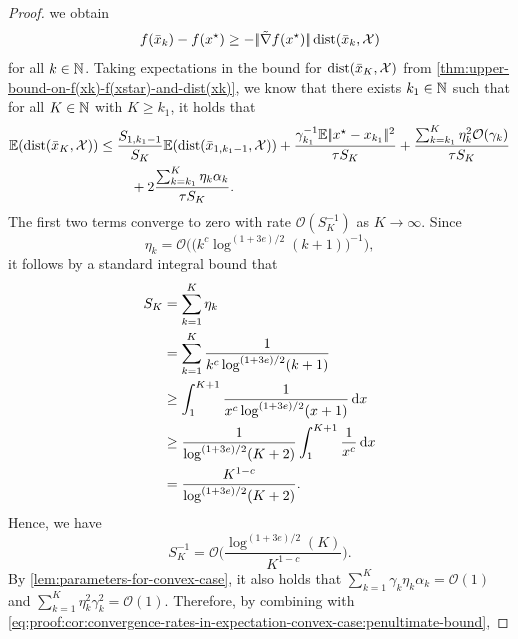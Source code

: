 \begin{proof}
    we obtain
    \begin{equation}
        \label{eq:proof:cor:convergence-rates-in-expectation-convex-case}
        f(\bar{x}_k) - f(x^\star) \geq - |\!|\tilde{\nabla} f(x^\star)|\!| \operatorname{dist}(\bar{x}_k, \mathcal{X})
    \end{equation}
    for all $k\in\mathbb{N}$.
    Taking expectations in the bound for $\operatorname{dist}(\bar{x}_K, \mathcal{X})$
    from \cref{thm:upper-bound-on-f(xk)-f(xstar)-and-dist(xk)},
    we know that there exists $k_1\in\mathbb{N}$ such that for all $K\in\mathbb{N}$ with $K\geq k_1$,
    it holds that
    \begin{align}
        \label{eq:proof:cor:convergence-rates-in-expectation-convex-case:penultimate-bound}
        \mathbb{E}(\operatorname{dist}(\bar{x}_K, \mathcal{X}))
        &\leq
        \frac{S_{1, k_1-1}}{S_K} \mathbb{E}(\operatorname{dist}(\bar{x}_{1, k_1-1}, \mathcal{X}))
            + \frac{\gamma_{k_1}^{-1}\mathbb{E}|\!|x^\star - x_{k_1}|\!|^2}{\tau S_K}
            + \frac{\sum_{k=k_1}^{K} \eta_k^2\mathcal{O}(\gamma_k)}{\tau S_K} \notag \\
        &\phantom{===}
            + 2 \frac{\sum_{k=k_1}^{K}\eta_k\alpha_k}{\tau S_K}.
    \end{align}
    The first two terms converge to zero with rate $\mathcal{O}(S_K^{-1})$ as $K\to\infty$.
    Since
    \[
        \eta_k = \mathcal{O}\big(\big(k^c \log^{(1 + 3e) / 2}(k+1)\big)^{-1}\big),
    \]
    it follows by a standard integral bound that
    \begin{align}
        \label{eq:proof:cor:convergence-rates-in-expectation-convex-case:SK-complexity}
        S_K &= \sum_{k=1}^K \eta_k \notag \\
            &= \sum_{k=1}^K \frac{1}{k^c \log^{(1 + 3e) / 2}(k+1)} \notag \\
            &\geq \int_{1}^{K+1} \frac{1}{x^c \log^{(1 + 3e) / 2}(x+1)} \, \text{d}x \notag \\
            &\geq \frac{1}{\log^{(1 + 3e) / 2}(K+2)} \int_{1}^{K+1} \frac{1}{x^c} \, \text{d}x \notag \\
            &= \frac{K^{1-c}}{\log^{(1 + 3e) / 2} (K+2)}.
    \end{align}
    Hence, we have
    \[
        S_K^{-1} = \mathcal{O}\Big( \frac{\log^{(1 + 3e) / 2} (K)}{K^{1-c}} \Big).
    \]
    By \cref{lem:parameters-for-convex-case}, it also holds that
    $\sum_{k=1}^K \gamma_k\eta_k \alpha_k = \mathcal{O}(1)$ and
    $\sum_{k=1}^K \eta_k^2\gamma_k^2 = \mathcal{O}(1)$.
    Therefore, by combining with \eqref{eq:proof:cor:convergence-rates-in-expectation-convex-case:penultimate-bound},

\end{proof}

